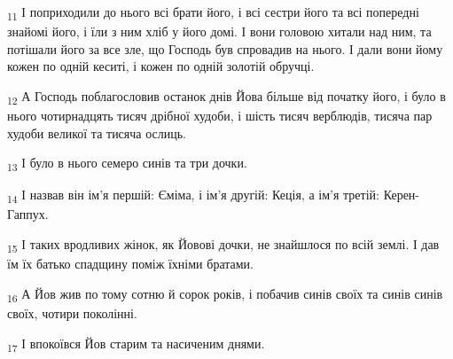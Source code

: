 \begin{tcolorbox}
\textsubscript{11} І поприходили до нього всі брати його, і всі сестри його та всі попередні знайомі його, і їли з ним хліб у його домі. І вони головою хитали над ним, та потішали його за все зле, що Господь був спровадив на нього. І дали вони йому кожен по одній кеситі, і кожен по одній золотій обручці.
\end{tcolorbox}
\begin{tcolorbox}
\textsubscript{12} А Господь поблагословив останок днів Йова більше від початку його, і було в нього чотирнадцять тисяч дрібної худоби, і шість тисяч верблюдів, тисяча пар худоби великої та тисяча ослиць.
\end{tcolorbox}
\begin{tcolorbox}
\textsubscript{13} І було в нього семеро синів та три дочки.
\end{tcolorbox}
\begin{tcolorbox}
\textsubscript{14} І назвав він ім'я першій: Єміма, і ім'я другій: Кеція, а ім'я третій: Керен-Гаппух.
\end{tcolorbox}
\begin{tcolorbox}
\textsubscript{15} І таких вродливих жінок, як Йовові дочки, не знайшлося по всій землі. І дав їм їх батько спадщину поміж їхніми братами.
\end{tcolorbox}
\begin{tcolorbox}
\textsubscript{16} А Йов жив по тому сотню й сорок років, і побачив синів своїх та синів синів своїх, чотири поколінні.
\end{tcolorbox}
\begin{tcolorbox}
\textsubscript{17} І впокоївся Йов старим та насиченим днями.
\end{tcolorbox}
